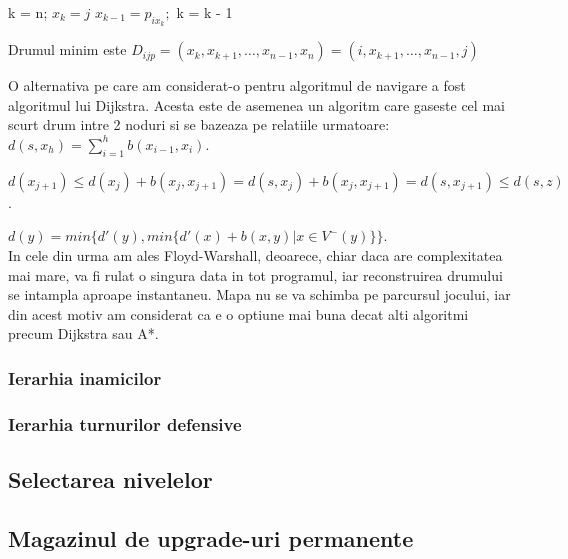 \documentclass[12pt, a4paper]{article}
\begin{document}
	\begin{algorithmic}
			\State k = n;
			\State $x_k = j$
				\State $x_{k - 1} = p_{ix_k};$
				\State k = k - 1
			\EndWhile
		\EndFunction
	\end{algorithmic}

	Drumul minim este $D_{ijp} = (x_k, x_{k+1}, \dots, x_{n-1}, x_n) = (i, x_{k+1}, \dots, x_{n-1}, j)$
	
	O alternativa pe care am considerat-o pentru algoritmul de navigare a fost algoritmul lui Dijkstra. Acesta este de asemenea un algoritm care gaseste cel mai scurt drum intre 2 noduri si se bazeaza pe relatiile urmatoare:
	\\
	
	$d(s, x_h) = \sum_{i=1}^{h} b(x_{i-1}, x_i)$.
	
	$d(x_{j+1}) \leq d(x_j) + b(x_j, x_{j+1}) = d(s, x_j) + b(x_j, x_{j+1}) = d(s, x_{j+1}) \leq d(s, z)$.
	
	$d(y) = min\{d'(y), min\{d'(x) + b(x, y) | x \in V^-(y)\}\}$.
	\\
	
	In cele din urma am ales Floyd-Warshall, deoarece, chiar daca are complexitatea mai mare, va fi rulat o singura data in tot programul, iar reconstruirea drumului se intampla aproape instantaneu. Mapa nu se va schimba pe parcursul jocului, iar din acest motiv am considerat ca e o optiune mai buna decat alti algoritmi precum Dijkstra sau A*.
	
	\subsubsection{Ierarhia inamicilor}
	
	\subsubsection{Ierarhia turnurilor defensive}
	
	
	\subsection{Selectarea nivelelor}
	
	
	
	\subsection{Magazinul de upgrade-uri permanente}
	
	
	
\end{document}
